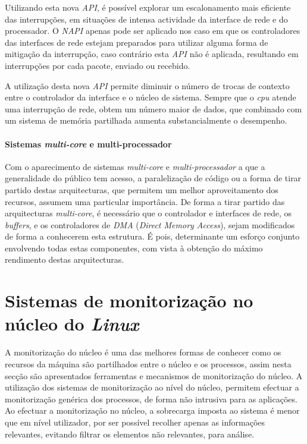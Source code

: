 Utilizando esta nova \textit{API}, é possível explorar um escalonamento mais eficiente das interrupções, em situações de intensa actividade da interface de rede e do processador.
O \textit{NAPI} apenas pode ser aplicado nos caso em que os controladores das interfaces de rede estejam preparados para utilizar alguma forma de mitigação da interrupção, caso contrário esta \textit{API} não é aplicada, resultando em interrupções por cada pacote, enviado ou recebido.

A utilização desta nova \textit{API} permite diminuir o número de trocas de contexto entre o controlador da interface e o núcleo de sistema.
Sempre que o \textit{cpu} atende uma interrupção de rede, obtem um número maior de dados, que combinado com um sistema de memória partilhada aumenta substancialmente o desempenho.


\paragraph*{Sistemas \textit{multi-core} e multi-processador}

Com o aparecimento de sistemas \textit{multi-core} e \textit{multi-processador} a que a generalidade do público tem acesso, a paralelização de código ou a forma de tirar partido destas arquitecturas, que permitem um melhor aproveitamento dos recursos, assumem uma particular importância.
De forma a tirar partido das arquitecturas \textit{multi-core}, é necessário que o controlador e interfaces de rede, os \textit{buffers}, e os controladores de \textit{DMA} (\textit{Direct Memory Access}), sejam modificados de forma a conhecerem esta estrutura.
É pois, determinante um esforço conjunto envolvendo todas estas componentes, com vista à obtenção do máximo rendimento destas arquitecturas\cite{Deri:2010}.



\section{Sistemas de monitorização no núcleo do \textit{Linux}}\label{sect:instrumentacao_casos_linux}

A monitorização do núcleo é uma das melhores formas de conhecer como os recursos da máquina são partilhados entre o núcleo e os processos, assim nesta secção são apresentados ferramentas e mecanismos de monitorização do núcleo.
A utilização dos sistemas de monitorização ao nível do núcleo, permitem efectuar a monitorização genérica dos processos, de forma não intrusiva para as aplicações.
Ao efectuar a monitorização no núcleo, a sobrecarga imposta ao sistema é menor que em nível utilizador, por ser possível recolher apenas as informações relevantes, evitando filtrar os elementos não relevantes, para análise.

